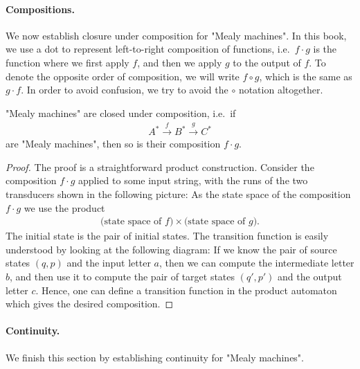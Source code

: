 \paragraph*{Compositions.} We now establish closure under composition for "Mealy machines". In this book, we use a dot to represent left-to-right composition of functions, i.e.~$f \cdot g$ is the function where we first apply $f$, and then we apply $g$ to the output of $f$. To denote the opposite order of composition, we will write $f \circ g$, which is the same as $g \cdot f$. In order to avoid confusion,  we try to avoid the $\circ$ notation altogether.
\begin{theorem}\label{thm:composition-mealy}
    "Mealy machines" are closed under composition, i.e.~if
    \begin{align*}
    A^* 
    \xrightarrow f 
    B^* 
    \xrightarrow g 
    C^*
    \end{align*}
    are "Mealy machines", then so is their composition $f \cdot g$. 
\end{theorem}
\begin{proof}
    The proof is a straightforward product construction. Consider the composition $f \cdot g$ applied to some input string, with the runs of the two transducers shown in the following picture:
    As the state space of the composition $f \cdot g$ we use the product 
    \begin{align*}
    \text{(state space of $f$)} \times \text{(state space of $g$)}.
    \end{align*}
    The initial state is the pair of initial states. The transition function is easily understood by looking at the following diagram:
     If we know the  pair of source states $(q,p)$ and the input letter $a$, then we can compute the intermediate letter $b$, and then use it to compute the pair of target states $(q',p')$ and the output letter $c$. Hence, one can define a transition function in the product automaton which gives the desired composition.
\end{proof}


\paragraph*{Continuity.} We finish this section by establishing continuity for "Mealy machines".

